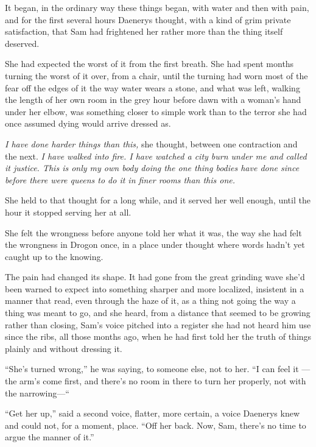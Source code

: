 It began, in the ordinary way these things began, with water and then with pain, and for the first several hours Daenerys thought, with a kind of grim private satisfaction, that Sam had frightened her rather more than the thing itself deserved.

She had expected the worst of it from the first breath. She had spent months turning the worst of it over, from a chair, until the turning had worn most of the fear off the edges of it the way water wears a stone, and what was left, walking the length of her own room in the grey hour before dawn with a woman’s hand under her elbow, was something closer to simple work than to the terror she had once assumed dying would arrive dressed as.

\textit{I have done harder things than this,} she thought, between one contraction and the next. \textit{I have walked into fire. I have watched a city burn under me and called it justice. This is only my own body doing the one thing bodies have done since before there were queens to do it in finer rooms than this one.}

She held to that thought for a long while, and it served her well enough, until the hour it stopped serving her at all.

\sceneBreak

She felt the wrongness before anyone told her what it was, the way she had felt the wrongness in Drogon once, in a place under thought where words hadn’t yet caught up to the knowing.

The pain had changed its shape. It had gone from the great grinding wave she’d been warned to expect into something sharper and more localized, insistent in a manner that read, even through the haze of it, as a thing not going the way a thing was meant to go, and she heard, from a distance that seemed to be growing rather than closing, Sam’s voice pitched into a register she had not heard him use since the ribs, all those months ago, when he had first told her the truth of things plainly and without dressing it.

“She’s turned wrong,” he was saying, to someone else, not to her. “I can feel it — the arm’s come first, and there’s no room in there to turn her properly, not with the narrowing—“

“Get her up,” said a second voice, flatter, more certain, a voice Daenerys knew and could not, for a moment, place. “Off her back. Now, Sam, there’s no time to argue the manner of it.”

\sceneBreak

